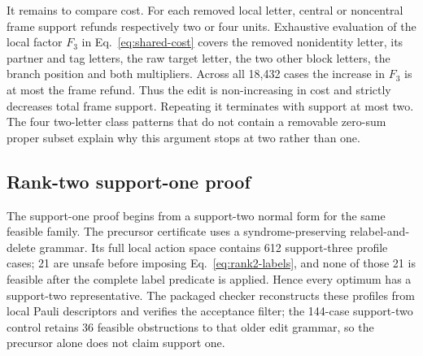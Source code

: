 \documentclass[a4paper,onecolumn,11pt,unpublished,noarxiv]{quantumarticle}
\begin{document}
It remains to compare cost.  For each removed local letter, central or noncentral frame support refunds respectively two or four units.  Exhaustive evaluation of the local factor $F_3$ in Eq.~\eqref{eq:shared-cost} covers the removed nonidentity letter, its partner and tag letters, the raw target letter, the two other block letters, the branch position and both multipliers.  Across all 18,432 cases the increase in $F_3$ is at most the frame refund.  Thus the edit is non-increasing in cost and strictly decreases total frame support.  Repeating it terminates with support at most two.  The four two-letter class patterns that do not contain a removable zero-sum proper subset explain why this argument stops at two rather than one.

\subsection{Rank-two support-one proof}

The support-one proof begins from a support-two normal form for the same feasible family.  The precursor certificate uses a syndrome-preserving relabel-and-delete grammar.  Its full local action space contains 612 support-three profile cases; 21 are unsafe before imposing Eq.~\eqref{eq:rank2-labels}, and none of those 21 is feasible after the complete label predicate is applied.  Hence every optimum has a support-two representative.  The packaged checker reconstructs these profiles from local Pauli descriptors and verifies the acceptance filter; the 144-case support-two control retains 36 feasible obstructions to that older edit grammar, so the precursor alone does not claim support one.
\end{document}
